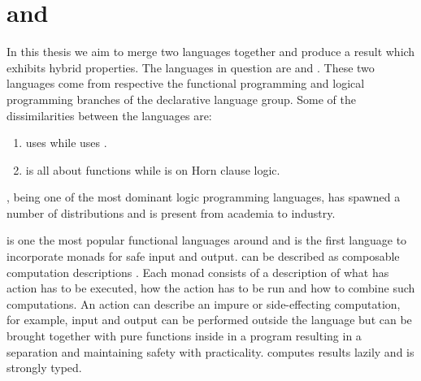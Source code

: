 \documentclass[thesis-solanki.tex]{subfiles}
\begin{document}
\section{ and }
In this thesis we aim to merge two languages
together and produce a result which exhibits hybrid
properties.
The languages in question are  and .
%
These two languages come from respective the functional programming and logical programming branches of the declarative language group.
Some of the dissimilarities between the languages are:
\begin{enumerate}
\item {}
  uses  while  uses
  . 
\item {} is all about functions while  is on Horn clause logic.
\end{enumerate} 

 \cite{wikiprolog}, being one of the most dominant logic programming languages, has spawned a
number of distributions and is present from academia to industry.

 is one the most popular \cite{website:langpop} functional languages around and is the first
language to incorporate monads \cite{wadler1992comprehending} for safe input and output.
can be 
described as composable computation descriptions \cite{website:monadshaskellorg}.
Each monad
consists of a description of what has action has to be executed, how the action has to be run and how to combine
such computations.
An action can describe an impure or side-effecting computation, for example, input and output can be performed
outside the language but can be brought together with pure functions inside in a program resulting in a separation
and maintaining safety with practicality.
 computes results lazily and is strongly typed.
\end{document}
